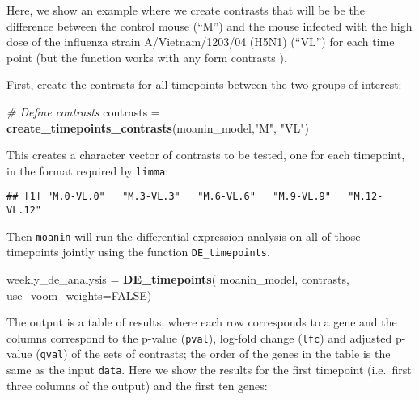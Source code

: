 \documentclass[9pt,a4paper,]{extarticle}
\newenvironment{Shaded}{\begin{snugshade}}{\end{snugshade}}
\newcommand{\CommentTok}[1]{\textcolor[rgb]{0.56,0.35,0.01}{\textit{#1}}}
\newcommand{\DataTypeTok}[1]{\textcolor[rgb]{0.13,0.29,0.53}{#1}}
\newcommand{\KeywordTok}[1]{\textcolor[rgb]{0.13,0.29,0.53}{\textbf{#1}}}
\newcommand{\NormalTok}[1]{#1}
\newcommand{\OtherTok}[1]{\textcolor[rgb]{0.56,0.35,0.01}{#1}}
\newcommand{\StringTok}[1]{\textcolor[rgb]{0.31,0.60,0.02}{#1}}
\begin{document}
Here, we show an example where we create contrasts that will be be the difference
between the control mouse (``M'') and the mouse infected with the high dose of
the influenza strain A/Vietnam/1203/04 (H5N1) (``VL'') for each time point (but
the function works with any form contrasts \citep{ritchie:limma}).

First, create the contrasts for all timepoints between the two groups of
interest:

\begin{Shaded}
\begin{Highlighting}[]
\CommentTok{# Define contrasts  }
\NormalTok{contrasts =}\StringTok{ }\KeywordTok{create_timepoints_contrasts}\NormalTok{(moanin_model,}\StringTok{"M"}\NormalTok{, }\StringTok{"VL"}\NormalTok{)}
\end{Highlighting}
\end{Shaded}

This creates a character vector of contrasts to be tested, one for each timepoint, in the format required by \texttt{limma}:

\begin{verbatim}
## [1] "M.0-VL.0"   "M.3-VL.3"   "M.6-VL.6"   "M.9-VL.9"   "M.12-VL.12"
\end{verbatim}

Then \texttt{moanin} will run the differential expression analysis on all of those timepoints
jointly using the function \texttt{DE\_timepoints}.

\begin{Shaded}
\begin{Highlighting}[]
\NormalTok{weekly_de_analysis =}\StringTok{ }\KeywordTok{DE_timepoints}\NormalTok{( moanin_model, contrasts,}
     \DataTypeTok{use_voom_weights=}\OtherTok{FALSE}\NormalTok{)}
\end{Highlighting}
\end{Shaded}

The output is a table of results, where each row corresponds to a gene and the
columns correspond to the p-value (\texttt{pval}), log-fold change (\texttt{lfc}) and
adjusted p-value (\texttt{qval}) of the sets of contrasts; the order of the genes in
the table is the same as the input \texttt{data}. Here we show the results for the
first timepoint (i.e.~first three columns of the output) and the first ten
genes:
\end{document}
